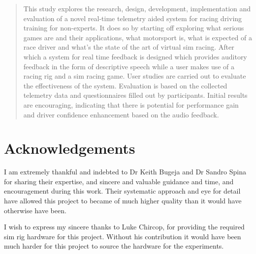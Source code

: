 \documentclass{report}
\begin{document}
\newpage
\begin{abstract}

This study explores the research, design, development, implementation and evaluation of a novel real-time telemetry aided system for racing driving training for non-experts. It does so by starting off exploring what serious games are and their applications, what motorsport is, what is expected of a race driver and what's the state of the art of virtual sim racing. After which a system for real time feedback is designed which provides auditory feedback in the form of descriptive speech while a user makes use of a racing rig and a sim racing game. User studies are carried out to evaluate the effectiveness of the system.  Evaluation is based on the collected telemetry data and questionnaires filled out by participants. Initial results are encouraging, indicating that there is potential for performance gain and driver confidence enhancement based on the audio feedback.


\end{abstract}

\newpage
\section*{Acknowledgements}

I am extremely thankful and indebted to Dr Keith Bugeja and Dr Sandro Spina for sharing their expertise, and sincere and valuable guidance and time, and encouragement during this work. Their systematic approach and eye for detail have allowed this project to became of much higher quality than it would have otherwise have been. 

I wish to express my sincere thanks to Luke Chircop, for providing the required sim rig hardware for this project. Without his contribution it would have been much harder for this project to source the hardware for the experiments.

\newpage
\tableofcontents

\newpage
\listoffigures
\listoftables

\newpage
{} 
\setcounter{page}{1}


\newpage


\newpage


\newpage


\newpage


\newpage


\newpage


\newpage
{}


\newpage
\setcounter{page}{1}
\begin{appendices}
	
\end{appendices}
\end{document}
